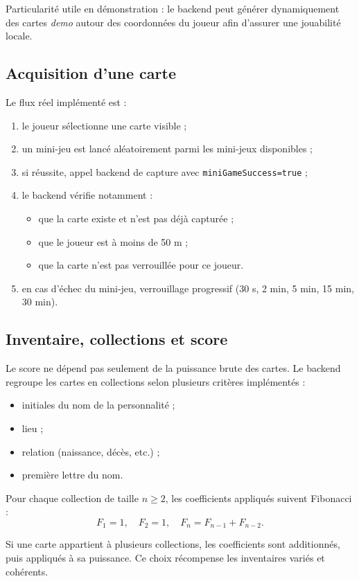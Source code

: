 \documentclass[11pt,a4paper]{article}
\begin{document}
Particularité utile en démonstration : le backend peut générer dynamiquement des cartes \emph{demo} autour des coordonnées du joueur afin d'assurer une jouabilité locale.

\subsection{Acquisition d'une carte}
Le flux réel implémenté est :
\begin{enumerate}[leftmargin=1.2cm]
  \item le joueur sélectionne une carte visible ;
  \item un mini-jeu est lancé aléatoirement parmi les mini-jeux disponibles ;
  \item si réussite, appel backend de capture avec \texttt{miniGameSuccess=true} ;
  \item le backend vérifie notamment :
  \begin{itemize}[leftmargin=0.8cm]
    \item que la carte existe et n'est pas déjà capturée ;
    \item que le joueur est à moins de 50 m ;
    \item que la carte n'est pas verrouillée pour ce joueur.
  \end{itemize}
  \item en cas d'échec du mini-jeu, verrouillage progressif (30 s, 2 min, 5 min, 15 min, 30 min).
\end{enumerate}

\subsection{Inventaire, collections et score}
Le score ne dépend pas seulement de la puissance brute des cartes. Le backend regroupe les cartes en collections selon plusieurs critères implémentés :
\begin{itemize}[leftmargin=1.2cm]
  \item initiales du nom de la personnalité ;
  \item lieu ;
  \item relation (naissance, décès, etc.) ;
  \item première lettre du nom.
\end{itemize}

Pour chaque collection de taille $n\ge 2$, les coefficients appliqués suivent Fibonacci :
\[
F_1=1,\quad F_2=1,\quad F_n=F_{n-1}+F_{n-2}.
\]

Si une carte appartient à plusieurs collections, les coefficients sont additionnés, puis appliqués à sa puissance. Ce choix récompense les inventaires variés et cohérents.
\end{document}
